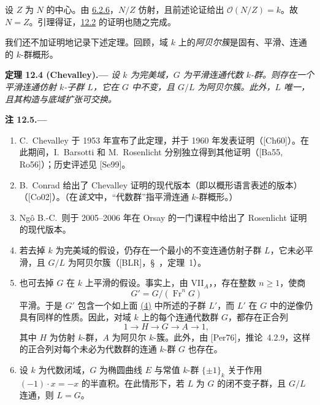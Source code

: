 设 \(Z\) 为 \(N\) 的中心。由 \hyperref[cor:sga3-VIB-6.2.6]{6.2.6}，\(N/Z\) 仿射，且前述论证给出 \(\mathcal O(N/Z)=k\)。故 \(N=Z\)。引理得证，\hyperref[thm:sga3-VIB-12.2]{12.2} 的证明也随之完成。

我们还不加证明地记录下述定理。回顾，域 \(k\) 上的\emph{阿贝尔簇}是固有、平滑、连通的 \(k\)-群概形。

\medskip
{}\label{thm:sga3-VIB-12.4}%
\noindent\textbf{定理 12.4 \textup{(Chevalley)}.---}
\emph{设 \(k\) 为完美域，\(G\) 为平滑连通代数 \(k\)-群。则存在一个平滑连通仿射 \(k\)-子群 \(L\)，它在 \(G\) 中不变，且 \(G/L\) 为阿贝尔簇。此外，\(L\) 唯一，且其构造与底域扩张可交换。}

\medskip
{}\label{rem:sga3-VIB-12.5}%
\noindent\textbf{注 12.5.---}
\begin{enumerate}
\item[\textup{(1)}]\label{rem:sga3-VIB-12.5-1}%
  C.~Chevalley 于 1953 年宣布了此定理，并于 1960 年发表证明\textup{（[Ch60]）}。在此期间，I.~Barsotti 和 M.~Rosenlicht 分别独立得到其他证明\textup{（[Ba55, Ro56]）}；历史评述见 \textup{[Se99]}。

\item[\textup{(2)}]\label{rem:sga3-VIB-12.5-2}%
  B.~Conrad 给出了 Chevalley 证明的现代版本\textup{（即以概形语言表述的版本）}\textup{（[Co02]）}。\textup{（在\emph{该文}中，“代数群”指平滑连通 \(k\)-群概形。）}

\item[\textup{(3)}]\label{rem:sga3-VIB-12.5-3}%
  Ngô B.-C.\ 则于 2005--2006 年在 Orsay 的一门课程中给出了 Rosenlicht 证明的现代版本。

\item[\textup{(4)}]\label{rem:sga3-VIB-12.5-4}%
  若去掉 \(k\) 为完美域的假设，仍存在一个最小的不变连通仿射子群 \(L\)，它未必平滑，且 \(G/L\) 为阿贝尔簇\textup{（[BLR]，\S~，定理~1）}。

\item[\textup{(5)}]\label{rem:sga3-VIB-12.5-5}%
  也可去掉 \(G\) 在 \(k\) 上平滑的假设。事实上，由 VII\(_A\)，，存在整数 \(n\geq1\)，使商
\[
    G'=G/(\operatorname{Fr}^nG)
  \]
  平滑。于是 \(G'\) 包含一个如上面 \hyperref[rem:sga3-VIB-12.5-4]{\textup{(4)}} 中所述的子群 \(L'\)，而 \(L'\) 在 \(G\) 中的逆像仍具有同样的性质。因此，对域 \(k\) 上的每个连通代数群 \(G\)，都存在正合列
  \label{form:sga3-VIB-12.5-connected-exact-sequence}%
\[
    1\longrightarrow H\longrightarrow G
      \longrightarrow A\longrightarrow1,
  \]
  其中 \(H\) 为仿射 \(k\)-群，\(A\) 为阿贝尔 \(k\)-簇。此外，由 \textup{[Per76]}，推论~4.2.9，这样的正合列对每个未必为代数群的连通 \(k\)-群 \(G\) 也存在。

\item[\textup{(6)}]\label{rem:sga3-VIB-12.5-6}%
  设 \(k\) 为代数闭域，\(G\) 为椭圆曲线 \(E\) 与常值 \(k\)-群 \(\{\pm1\}_k\) 关于作用 \((-1)\cdot x=-x\) 的半直积。在此情形下，若 \(L\) 为 \(G\) 的闭不变子群，且 \(G/L\) 连通，则 \(L=G\)。
\end{enumerate}

